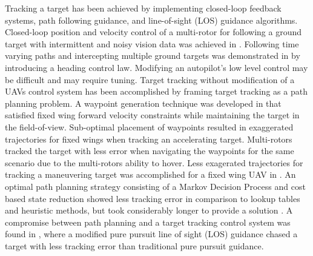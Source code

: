 \documentclass[conference]{IEEEtran}
\begin{document}
Tracking a target has been achieved by implementing closed-loop feedback systems, path following guidance, and line-of-sight (LOS) guidance algorithms. Closed-loop position and velocity control of a multi-rotor for following a ground target with intermittent and noisy vision data was achieved in \cite{teuliere_chasing_2011}. Following time varying paths and intercepting multiple ground targets was demonstrated in \cite{oliveira_moving_2016} by introducing a heading control law. Modifying an autopilot's low level control may be difficult and may require tuning.
Target tracking without modification of a UAVs control system has been accomplished by framing target tracking as a path planning problem. A waypoint generation technique was developed in \cite{ariyur_autonomous_2008} that satisfied fixed wing forward velocity constraints while maintaining the target in the field-of-view. Sub-optimal placement of waypoints resulted in exaggerated trajectories for fixed wings when tracking an accelerating target. Multi-rotors tracked the target with less error when navigating the waypoints for the same scenario due to the multi-rotors ability to hover. Less exagerated trajectories for tracking a maneuvering target was accomplished for a fixed wing UAV in \cite{lee_strategies_2003}. An optimal path planning strategy consisting of a Markov Decision Process and cost based state reduction showed less tracking error in comparison to lookup tables and heuristic methods, but took considerably longer to provide a solution \cite{baek_optimal_2013}. A compromise between path planning and a target tracking control system was found in \cite{yamasaki_advanced_2009}, where a modified pure pursuit line of sight (LOS) guidance chased a target with less tracking error than traditional pure pursuit guidance\cite{yamasaki_advanced_2009}. 
\end{document}
